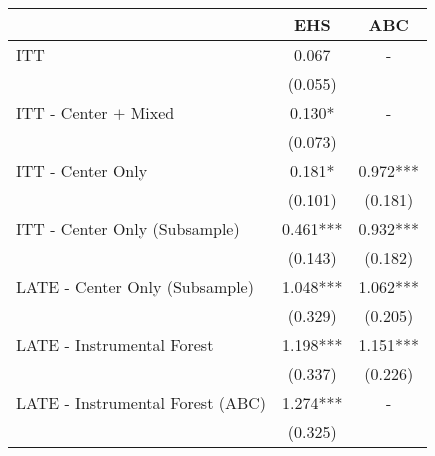 \begin{tabular}{lcc}
\toprule 
\midrule 
 & EHS & ABC \\
\midrule 
ITT & 0.067 & - \\
 & (0.055) \\
ITT - Center $+$ Mixed & 0.130* & - \\
 & (0.073) \\
ITT - Center Only & 0.181* & 0.972*** \\
 & (0.101) & (0.181) \\
ITT - Center Only (Subsample) & 0.461*** & 0.932*** \\
 & (0.143) & (0.182) \\
LATE - Center Only (Subsample) & 1.048*** & 1.062*** \\
 & (0.329) & (0.205) \\
LATE - Instrumental Forest & 1.198*** & 1.151*** \\
 & (0.337) & (0.226) \\
LATE - Instrumental Forest (ABC) & 1.274*** & - \\
 & (0.325) \\
\midrule 
\bottomrule 
\end{tabular}
